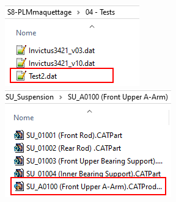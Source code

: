 \begin{figure}
    \centering
    \begin{subfigure}{.35\textwidth}
        \includegraphics[width=.8\textwidth]{img/maj_file1.png}
        \includegraphics[width=\textwidth]{img/maj_file3.png}
    \end{subfigure}{}
    \begin{subfigure}{.3\textwidth}
        \centering

\end{subfigure}
\end{figure}
